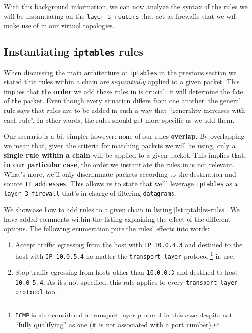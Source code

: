             With this background information, we can now analyze the syntax of the rules we will be instantiating on the \texttt{layer 3 routers} that act as firewalls that we will make use of in our virtual topologies.

        \subsection{Instantiating \texttt{iptables} rules}
            When discussing the main architecture of \texttt{iptables} in the previous section we stated that rules within a chain are \textit{sequentially} applied to a given packet. This implies that the \textbf{order} we add these rules in is crucial: it will determine the fate of the packet. Even though every situation differs from one another, the general rule says that rules are to be added in such a way that ``generality increases with each rule''. In other words, the rules should get more specific as we add them.

            Our scenario is a bit simpler however: none of our rules \textbf{overlap}. By overlapping we mean that, given the criteria for matching packets we will be using, only a \textbf{single rule within a chain} will be applied to a given packet. This implies that, \textbf{in our particular case}, the order we instantiate the rules in is not relevant. What's more, we'll only discriminate packets according to the destination and source \texttt{IP addresses}. This allows us to state that we'll leverage \texttt{iptables} as a \texttt{layer 3 firewall} that's in charge of filtering \texttt{datagrams}.

            We showcase how to add rules to a given chain in listing \ref{lst:iptables-rules}. We have added comments within the listing explaining the effect of the different options. The following enumeration puts the rules' effects into words:

            \begin{enumerate}
                \item Accept traffic egressing from the host with \texttt{IP 10.0.0.3} and destined to the host with \texttt{IP 10.0.5.4} no matter the \texttt{transport layer} protocol \footnote{\texttt{ICMP} is also considered a transport layer protocol in this case despite not ``fully qualifying'' as one (it is not associated with a port number).} in use.
                \item Stop traffic egressing from hosts other than \texttt{10.0.0.3} and destined to host \texttt{10.0.5.4}. As it's not specified, this rule applies to every \texttt{transport layer protocol} too.
            \end{enumerate}

